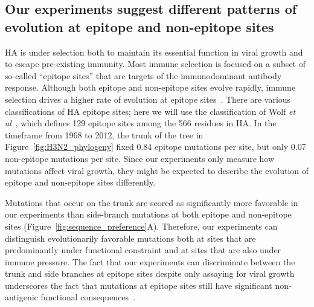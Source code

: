 \documentclass[9pt,twocolumn,twoside]{pnas-new}
\begin{document}
\subsection*{Our experiments suggest different patterns of evolution at epitope and non-epitope sites}
HA is under selection both to maintain its essential function in viral growth and to escape pre-existing immunity.
Most immune selection is focused on a subset of so-called ``epitope sites'' that are targets of the immunodominant antibody response.
Although both epitope and non-epitope sites evolve rapidly, immune selection drives a higher rate of evolution at epitope sites~\cite{fitch1991positive,wolf2006long,bhatt2011genomic}.
There are various classifications of HA epitope sites; here we will use the classification of Wolf \textit{et al}~\cite{wolf2006long}, which defines 129 epitope sites among the 566 residues in HA.
In the timeframe from 1968 to 2012, the trunk of the tree in Figure~\ref{fig:H3N2_phylogeny} fixed 0.84 epitope mutations per site, but only 0.07 non-epitope mutations per site.
Since our experiments only measure how mutations affect viral growth, they might be expected to describe the evolution of epitope and non-epitope sites differently.

Mutations that occur on the trunk are scored as significantly more favorable in our experiments than side-branch mutations at both epitope and non-epitope sites (Figure~\ref{fig:sequence_preference}A).
Therefore, our experiments can distinguish evolutionarily favorable mutations both at sites that are predominantly under functional constraint and at sites that are also under immune pressure.
The fact that our experiments can discriminate between the trunk and side branches at epitope sites despite only assaying for viral growth underscores the fact that mutations at epitope sites still have significant non-antigenic functional consequences~\cite{nakajima2003restriction,das2013defining,koel2013substitutions}. 
\end{document}
